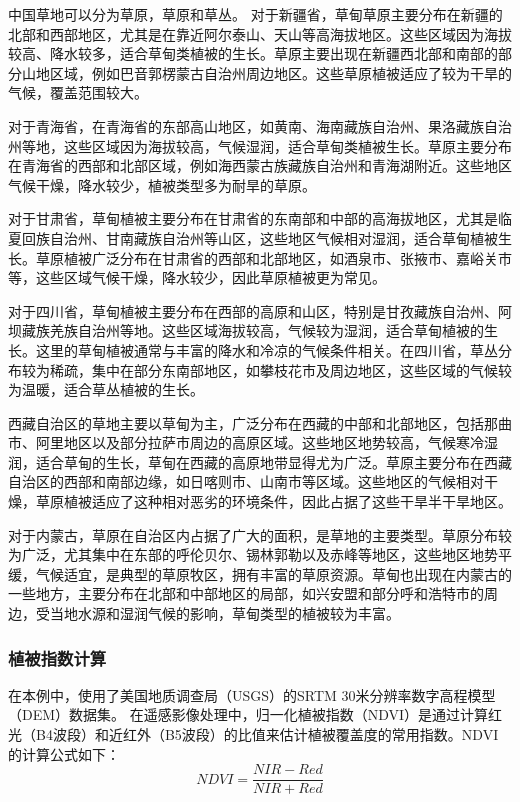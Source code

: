 \documentclass{article}
\begin{document}
		中国草地可以分为草原，草原和草丛。
	对于新疆省，草甸草原主要分布在新疆的北部和西部地区，尤其是在靠近阿尔泰山、天山等高海拔地区。这些区域因为海拔较高、降水较多，适合草甸类植被的生长。草原主要出现在新疆西北部和南部的部分山地区域，例如巴音郭楞蒙古自治州周边地区。这些草原植被适应了较为干旱的气候，覆盖范围较大。
		\par 对于青海省，在青海省的东部高山地区，如黄南、海南藏族自治州、果洛藏族自治州等地，这些区域因为海拔较高，气候湿润，适合草甸类植被生长。草原主要分布在青海省的西部和北部区域，例如海西蒙古族藏族自治州和青海湖附近。这些地区气候干燥，降水较少，植被类型多为耐旱的草原。
		\par 对于甘肃省，草甸植被主要分布在甘肃省的东南部和中部的高海拔地区，尤其是临夏回族自治州、甘南藏族自治州等山区，这些地区气候相对湿润，适合草甸植被生长。草原植被广泛分布在甘肃省的西部和北部地区，如酒泉市、张掖市、嘉峪关市等，这些区域气候干燥，降水较少，因此草原植被更为常见。
	
	
	\par 对于四川省，草甸植被主要分布在西部的高原和山区，特别是甘孜藏族自治州、阿坝藏族羌族自治州等地。这些区域海拔较高，气候较为湿润，适合草甸植被的生长。这里的草甸植被通常与丰富的降水和冷凉的气候条件相关。在四川省，草丛分布较为稀疏，集中在部分东南部地区，如攀枝花市及周边地区，这些区域的气候较为温暖，适合草丛植被的生长。
	
		\par 西藏自治区的草地主要以草甸为主，广泛分布在西藏的中部和北部地区，包括那曲市、阿里地区以及部分拉萨市周边的高原区域。这些地区地势较高，气候寒冷湿润，适合草甸的生长，草甸在西藏的高原地带显得尤为广泛。草原主要分布在西藏自治区的西部和南部边缘，如日喀则市、山南市等区域。这些地区的气候相对干燥，草原植被适应了这种相对恶劣的环境条件，因此占据了这些干旱半干旱地区。
		
		\par 对于内蒙古，草原在自治区内占据了广大的面积，是草地的主要类型。草原分布较为广泛，尤其集中在东部的呼伦贝尔、锡林郭勒以及赤峰等地区，这些地区地势平缓，气候适宜，是典型的草原牧区，拥有丰富的草原资源。草甸也出现在内蒙古的一些地方，主要分布在北部和中部地区的局部，如兴安盟和部分呼和浩特市的周边，受当地水源和湿润气候的影响，草甸类型的植被较为丰富。
		
		
		
		\subsubsection{植被指数计算}
		
				
		在本例中，使用了美国地质调查局（USGS）的SRTM 30米分辨率数字高程模型（DEM）数据集。
		在遥感影像处理中，归一化植被指数（NDVI）是通过计算红光（B4波段）和近红外（B5波段）的比值来估计植被覆盖度的常用指数。NDVI的计算公式如下：
		\[
		NDVI = \frac{NIR - Red}{NIR + Red}
		\]
		
\end{document}
